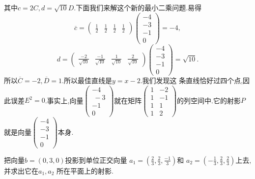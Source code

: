 ﻿\documentclass{book} \usepackage{exsheets} \usepackage{xeCJK}
\begin{document}
\begin{solution}
$$$$
其中$c=2C,d=\sqrt{10}D$.下面我们来解这个新的最小二乘问题.易得
$$
\overline{c}=
\begin{pmatrix}
  \frac{1}{2}&\frac{1}{2}&\frac{1}{2}&\frac{1}{2}
\end{pmatrix}
\begin{pmatrix}
  -4\\
-3\\
-1\\
0
\end{pmatrix}=-4,
$$
$$
d=
\begin{pmatrix}
  \frac{-2}{\sqrt{10}}&\frac{-1}{\sqrt{10}}&\frac{1}{\sqrt{10}}&\frac{2}{\sqrt{10}}
\end{pmatrix}
\begin{pmatrix}
  -4\\
-3\\
-1\\
0
\end{pmatrix}=\sqrt{10}.
$$
所以$\overline{C}=-2,\overline{D}=1$.所以最佳直线是$y=x-2$.我们发现这
条直线恰好过四个点,因此误差$E^2=0$.事实上,向量$
\begin{pmatrix}
  -4\\\
-3\\
-1\\
0
\end{pmatrix}
$就在矩阵$
\begin{pmatrix}
  1&-2\\
1&-1\\
1&1\\
1&2
\end{pmatrix}
$的列空间中.它的射影$P$就是向量$
\begin{pmatrix}
  -4\\
-3\\
-1\\
0
\end{pmatrix}
$本身.
\end{solution}
\begin{question}
  把向量$b=(0,3,0)$投影到{\color{red}单位}正交向量
  $a_1=(\frac{2}{3},\frac{2}{3},\frac{-1}{3})$和
  $a_2=(-\frac{1}{3},\frac{2}{3},\frac{2}{3})$上去,并求出它在$a_1,a_2$
  所在平面上的射影.
\end{question}
\end{document}
